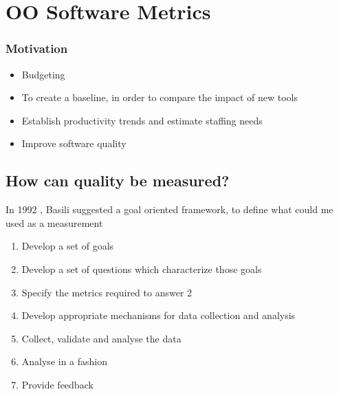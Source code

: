 \section{OO Software Metrics}





\subsubsection{Motivation}

\begin{itemize}
	\item Budgeting 
	\item To create a baseline, in order to compare the impact of new tools
	\item Establish productivity trends and estimate staffing needs
	\item Improve software quality
\end{itemize}

\subsection{How can quality be measured?}

\par{In 1992 , Basili \cite{basili92} suggested a  goal oriented
framework, to define what could me used as a measurement}

\begin{enumerate}
	\item Develop a set of goals
	\item Develop a set of questions which characterize those goals
	\item Specify the metrics required to answer 2
	\item Develop appropriate mechanisms for data collection and analysis
	\item Collect, validate and analyse the data
	\item Analyse in a  fashion
	\item Provide feedback
\end{enumerate}

